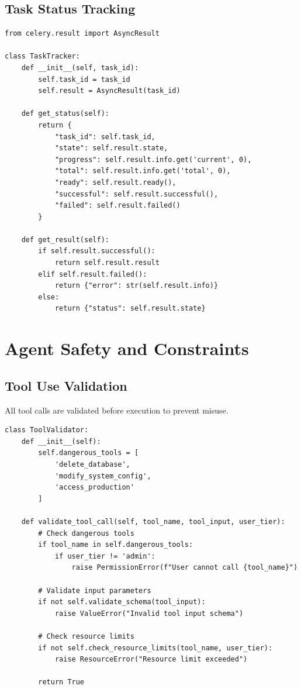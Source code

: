 \documentclass{report}
\begin{document}
\section{Task Status Tracking}

\begin{lstlisting}
from celery.result import AsyncResult

class TaskTracker:
    def __init__(self, task_id):
        self.task_id = task_id
        self.result = AsyncResult(task_id)
    
    def get_status(self):
        return {
            "task_id": self.task_id,
            "state": self.result.state,
            "progress": self.result.info.get('current', 0),
            "total": self.result.info.get('total', 0),
            "ready": self.result.ready(),
            "successful": self.result.successful(),
            "failed": self.result.failed()
        }
    
    def get_result(self):
        if self.result.successful():
            return self.result.result
        elif self.result.failed():
            return {"error": str(self.result.info)}
        else:
            return {"status": self.result.state}
\end{lstlisting}

\chapter{Agent Safety and Constraints}

\section{Tool Use Validation}

All tool calls are validated before execution to prevent misuse.

\begin{lstlisting}
class ToolValidator:
    def __init__(self):
        self.dangerous_tools = [
            'delete_database',
            'modify_system_config',
            'access_production'
        ]
    
    def validate_tool_call(self, tool_name, tool_input, user_tier):
        # Check dangerous tools
        if tool_name in self.dangerous_tools:
            if user_tier != 'admin':
                raise PermissionError(f"User cannot call {tool_name}")
        
        # Validate input parameters
        if not self.validate_schema(tool_input):
            raise ValueError("Invalid tool input schema")
        
        # Check resource limits
        if not self.check_resource_limits(tool_name, user_tier):
            raise ResourceError("Resource limit exceeded")
        
        return True
\end{lstlisting}
\end{document}
